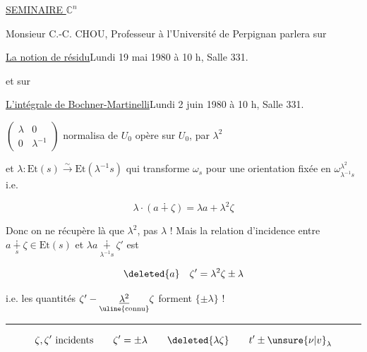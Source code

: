 \uline{SEMINAIRE $\mathbb C^n$}

Monsieur C.-C. CHOU, Professeur à l'Université de Perpignan parlera sur

\uline{La notion de résidu}\qquad Lundi 19 mai 1980 à 10 h, Salle 331.

et sur

\uline{L'intégrale de Bochner-Martinelli}\qquad Lundi 2 juin 1980 à 10 h, Salle 331.


$\begin{pmatrix}\lambda&0\\0&\lambda^{-1}\end{pmatrix}$ normalisa de $U_0$ opère sur $U_0$, par $\boxed{\lambda^2}$

et $\lambda:\mathrm{Et}(s)\xrightarrow{\sim}\mathrm{Et}(\lambda^{-1}s)$ qui transforme $\omega_s$ pour une orientation fixée en $\omega_{\lambda^{-1}s}^{\boxed{\lambda^2}}$ i.e.

\[
\boxed{\lambda\cdot(a\dotplus\zeta)=\lambda a+\lambda^2\zeta}
\]

Donc on ne récupère là que $\lambda^2$, pas $\lambda$ ! Mais la relation d'incidence entre $a\underset{s}{\dotplus}\zeta\in\mathrm{Et}(s)$ et $\lambda a\underset{\lambda^{-1}s}{\dotplus}\zeta'$ est

\[
\deleted{a}\quad\zeta'=\lambda^2\zeta\pm\lambda
\]

i.e. les quantités $\zeta'-\underset{\text{\uline{connu}}}{\underline{\lambda^2}}\zeta$ forment  $\{\pm\lambda\}$ !

\noindent\rule{\linewidth}{.35pt}

\[
\zeta,\zeta'\ \text{incidents}\qquad\zeta'=\pm\lambda\qquad\deleted{\lambda\zeta}\qquad t'\pm\unsure{\nu|v}_{\lambda}
\]


